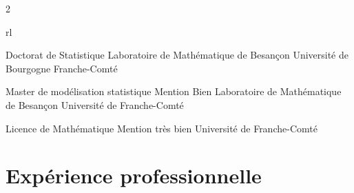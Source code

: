 \documentclass[10pt]{article} %
\begin{document}
\begin{paracol}{2}



\begin{supertabular}{rl} %

	
	{Doctorat de Statistique} %
	{} %
	{Laboratoire de Mathématique de Besançon} %
	{Université de Bourgogne Franche-Comté} %
	
	
	{Master de modélisation statistique} %
	{Mention Bien} %
	{Laboratoire de Mathématique de Besançon} %
	{Université de Franche-Comté} %
	
	
	{Licence de Mathématique} %
	{Mention très bien} %
	{} %
	{Université de Franche-Comté} %
	

\end{supertabular}

\section{Expérience professionnelle}




\end{paracol}
\end{document}
